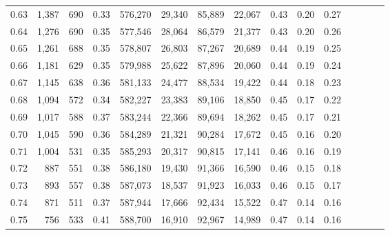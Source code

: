 \begin{tabular}{rrrcrrrrrrrrrrr}
0.63 &   1,387 &    690 &                                       0.33 &  576,270 &   29,340 &   85,889 &   22,067 &  0.43 &  0.20 &                         0.27 \\
0.64 &   1,276 &    690 &                                       0.35 &  577,546 &   28,064 &   86,579 &   21,377 &  0.43 &  0.20 &                         0.26 \\
0.65 &   1,261 &    688 &                                       0.35 &  578,807 &   26,803 &   87,267 &   20,689 &  0.44 &  0.19 &                         0.25 \\
0.66 &   1,181 &    629 &                                       0.35 &  579,988 &   25,622 &   87,896 &   20,060 &  0.44 &  0.19 &                         0.24 \\
0.67 &   1,145 &    638 &                                       0.36 &  581,133 &   24,477 &   88,534 &   19,422 &  0.44 &  0.18 &                         0.23 \\
0.68 &   1,094 &    572 &                                       0.34 &  582,227 &   23,383 &   89,106 &   18,850 &  0.45 &  0.17 &                         0.22 \\
0.69 &   1,017 &    588 &                                       0.37 &  583,244 &   22,366 &   89,694 &   18,262 &  0.45 &  0.17 &                         0.21 \\
0.70 &   1,045 &    590 &                                       0.36 &  584,289 &   21,321 &   90,284 &   17,672 &  0.45 &  0.16 &                         0.20 \\
0.71 &   1,004 &    531 &                                       0.35 &  585,293 &   20,317 &   90,815 &   17,141 &  0.46 &  0.16 &                         0.19 \\
0.72 &     887 &    551 &                                       0.38 &  586,180 &   19,430 &   91,366 &   16,590 &  0.46 &  0.15 &                         0.18 \\
0.73 &     893 &    557 &                                       0.38 &  587,073 &   18,537 &   91,923 &   16,033 &  0.46 &  0.15 &                         0.17 \\
0.74 &     871 &    511 &                                       0.37 &  587,944 &   17,666 &   92,434 &   15,522 &  0.47 &  0.14 &                         0.16 \\
0.75 &     756 &    533 &                                       0.41 &  588,700 &   16,910 &   92,967 &   14,989 &  0.47 &  0.14 &                         0.16 \\

\end{tabular}
